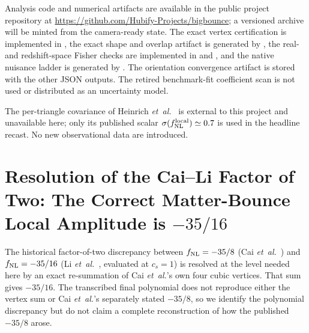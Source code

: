 \documentclass[aps,prd,twocolumn,superscriptaddress,showpacs,preprintnumbers,nofootinbib,longbibliography,floatfix]{revtex4-2}
\newcommand{\fnl}{f_{\rm NL}}
\newcommand{\etal}{\textit{et~al.}}
\begin{document}
Analysis code and numerical artifacts are available in the public project repository at \url{https://github.com/Hubify-Projects/bigbounce}; a versioned archive will be minted from the camera-ready state. The exact vertex certification is implemented in , the exact shape and overlap artifact is generated by , the real- and redshift-space Fisher checks are implemented in  and , and the native nuisance ladder is generated by . The orientation convergence artifact is stored with the other JSON outputs. The retired benchmark-fit coefficient scan is not used or distributed as an uncertainty model.

The per-triangle covariance of Heinrich \etal~\cite{Heinrich:2023} is external to this project and unavailable here; only its published scalar $\sigma(\fnl^{\rm local})\simeq0.7$ is used in the headline recast. No new observational data are introduced.
\appendix

\section{Resolution of the Cai--Li Factor of Two: The Correct Matter-Bounce Local Amplitude is $-35/16$}
\label{app:convention}

The historical factor-of-two discrepancy between $\fnl = -35/8$ (Cai \textit{et~al.}~\cite{Cai:2009fn}) and $\fnl = -35/16$ (Li \etal~\cite{LiQuintin:2017}, evaluated at $c_s=1$) is resolved at the level needed here by an exact re-summation of Cai \etal's own four cubic vertices. That sum gives $-35/16$. The transcribed final polynomial does not reproduce either the vertex sum or Cai \etal's separately stated $-35/8$, so we identify the polynomial discrepancy but do not claim a complete reconstruction of how the published $-35/8$ arose.
\end{document}
